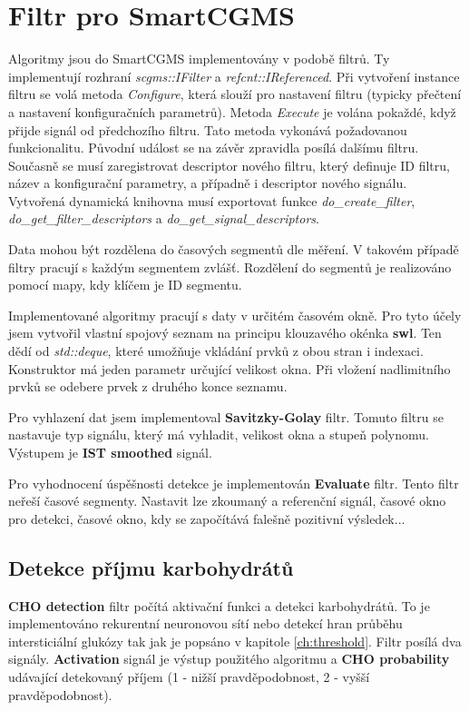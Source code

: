 \section{Filtr pro SmartCGMS}

Algoritmy jsou do SmartCGMS implementovány v podobě filtrů. Ty implementují rozhraní \textit{scgms::IFilter} a \textit{refcnt::IReferenced}. Při vytvoření instance filtru se volá metoda \textit{Configure}, která slouží pro nastavení filtru (typicky přečtení a nastavení konfiguračních parametrů). Metoda \textit{Execute} je volána pokaždé, když přijde signál od předchozího filtru. Tato metoda vykonává požadovanou funkcionalitu. Původní událost se na závěr zpravidla posílá dalšímu filtru. Současně se musí zaregistrovat descriptor nového filtru, který definuje ID filtru, název a konfigurační parametry, a případně i descriptor nového signálu. Vytvořená dynamická knihovna musí exportovat funkce \textit{do\_create\_filter}, \textit{do\_get\_filter\_descriptors} a \textit{do\_get\_signal\_descriptors}.

Data mohou být rozdělena do časových segmentů dle měření. V takovém případě filtry pracují s každým segmentem zvlášť. Rozdělení do segmentů je realizováno pomocí mapy, kdy klíčem je ID segmentu.

Implementované algoritmy pracují s daty v určitém časovém okně. Pro tyto účely jsem vytvořil vlastní spojový seznam na principu klouzavého okénka \textbf{swl}. Ten dědí od \textit{std::deque}, které umožňuje vkládání prvků z obou stran i indexaci. Konstruktor má jeden parametr určující velikost okna. Při vložení nadlimitního prvků se odebere prvek z druhého konce seznamu.

Pro vyhlazení dat jsem implementoval \textbf{Savitzky-Golay} filtr. Tomuto filtru se nastavuje typ signálu, který má vyhladit, velikost okna a stupeň polynomu. Výstupem je \textbf{IST smoothed} signál.

Pro vyhodnocení úspěšnosti detekce je implementován \textbf{Evaluate} filtr. Tento filtr neřeší časové segmenty. Nastavit lze zkoumaný a referenční signál, časové okno pro detekci, časové okno, kdy se započítává falešně pozitivní výsledek...

\subsection{Detekce příjmu karbohydrátů}

\textbf{CHO detection} filtr počítá aktivační funkci a detekci karbohydrátů. To je implementováno rekurentní neuronovou sítí nebo detekcí hran průběhu intersticiální glukózy tak jak je popsáno v kapitole \ref{ch:threshold}. Filtr posílá dva signály. \textbf{Activation} signál je výstup použitého algoritmu a \textbf{CHO probability} udávající detekovaný příjem (1 - nižší pravděpodobnost, 2 - vyšší pravděpodobnost).

